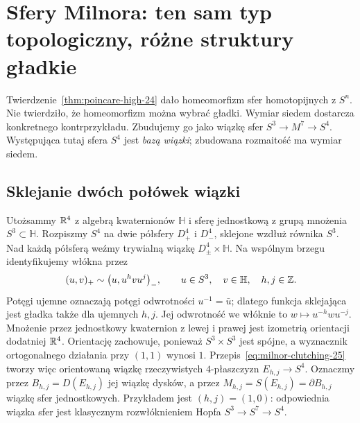\chapter{Sfery Milnora: ten sam typ topologiczny,
 różne struktury gładkie}
\label{ch:sfery-Milnora}

Twierdzenie~\ref{thm:poincare-high-24}
dało homeomorfizm sfer homotopijnych
z $S^n$. Nie twierdziło, że homeomorfizm
można wybrać gładki. Wymiar siedem
dostarcza konkretnego kontrprzykładu.
Zbudujemy go jako wiązkę sfer
$S^3\to M^7\to S^4$.
Występująca tutaj sfera $S^4$
jest \emph{bazą wiązki}; zbudowana
rozmaitość ma wymiar siedem.

\section{Sklejanie dwóch połówek wiązki}
\label{sec:milnor-clutching-25}

Utożsammy $\mathbb{R}^4$ z algebrą kwaternionów
$\mathbb H$ i sferę jednostkową
z grupą mnożenia $S^3\subset\mathbb H$.
Rozpiszmy $S^4$ na dwie półsfery
$D^4_+$ i $D^4_-$, sklejone wzdłuż
równika $S^3$. Nad każdą półsferą
weźmy trywialną wiązkę
$D^4_\pm\times\mathbb H$.
Na wspólnym brzegu identyfikujemy
włókna przez
\begin{equation}\label{eq:milnor-clutching-25}
 (u,v)_+\sim
 \bigl(u,u^hvu^j\bigr)_-,
 \qquad u\in S^3,\quad v\in\mathbb H,
 \quad h,j\in\mathbb{Z}.
\end{equation}
Potęgi ujemne oznaczają potęgi odwrotności $u^{-1}=\bar u$;
dlatego funkcja sklejająca jest gładka także dla ujemnych $h,j$.
Jej odwrotność we włóknie to $w\mapsto u^{-h}wu^{-j}$.
Mnożenie przez jednostkowy kwaternion
z lewej i prawej jest izometrią
orientacji dodatniej $\mathbb{R}^4$.
Orientację zachowuje, ponieważ $S^3\times S^3$ jest spójne,
a wyznacznik ortogonalnego działania przy $(1,1)$ wynosi $1$.
Przepis~\eqref{eq:milnor-clutching-25}
tworzy więc orientowaną wiązkę
rzeczywistych $4$-płaszczyzn
$E_{h,j}\to S^4$. Oznaczmy przez
$B_{h,j}=D(E_{h,j})$ jej wiązkę
dysków, a przez
$M_{h,j}=S(E_{h,j})=\partial B_{h,j}$
wiązkę sfer jednostkowych.
Przykładem jest $(h,j)=(1,0)$:
odpowiednia wiązka sfer jest
klasycznym rozwłóknieniem Hopfa
$S^3\to S^7\to S^4$.


